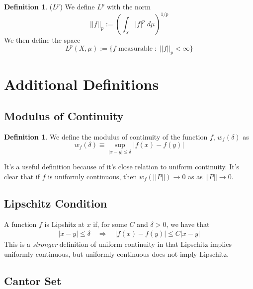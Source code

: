 \documentclass[12pt]{article}
\theoremstyle{plain}
\theoremstyle{definition}
\newtheorem{defn}[thm]{Definition}
\theoremstyle{remark}
\begin{document}
\begin{defn} ($L^p$) We define $L^p$ with the norm
\[
    ||f||_p:= \left(\int_X |f|^p \; d\mu\right)^{1/p}
\]
We then define the space
\[
    L^p(X,\mu) := \{\text{$f$ measurable}\;:\;
    \text{$||f||_p < \infty$}\}
\]
\end{defn}





\newpage
\appendix


\section{Additional Definitions}

\subsection{Modulus of Continuity}

\begin{defn} We define the modulus of continuity of the function $f$, $w_f(\delta)$ as 
\begin{equation}
    w_f(\delta) \equiv \sup_{|x-y|\leq\delta} |f(x)-f(y)|
\end{equation}
\end{defn}
It's a useful definition because of it's close relation to uniform continuity.
It's clear that if $f$ is uniformly continuous, then $w_f\left(||P||\right)\rightarrow0$ as as $||P||\rightarrow0$.

\subsection{Lipschitz Condition}

A function $f$ is Lipshitz at $x$ if, for some $C$ and $\delta>0$, we have that 
\begin{align*}
    |x-y|\leq \delta \quad \Rightarrow \quad 
        |f(x) - f(y)|\leq C|x-y|
\end{align*}
This is a \emph{stronger} definition of uniform continuity in that Lipschitz implies uniformly continuous, but uniformly continuous does not imply Lipschitz.

\subsection{Cantor Set}
\end{document}
